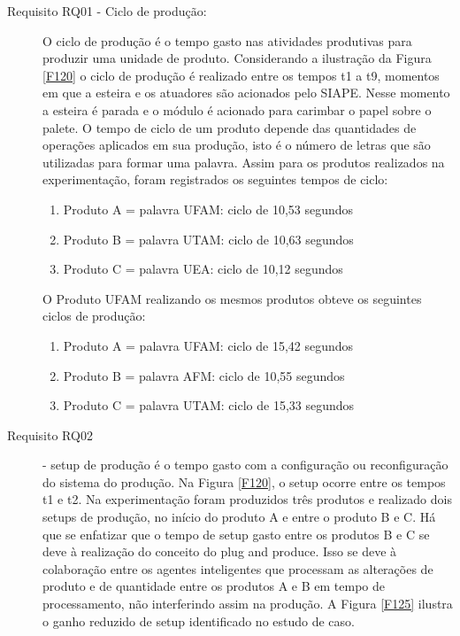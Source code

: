 \documentclass[10pt,letterpaper,twocolumn]{IEEEtran}
\begin{document}
\begin{description}
	\item[Requisito RQ01 - Ciclo de produção:] O ciclo de produção é o tempo gasto nas atividades produtivas para produzir uma unidade de produto. Considerando a ilustração da Figura \ref{F120} o ciclo de produção é realizado entre os tempos t1 a t9, momentos em que a esteira e os atuadores são acionados pelo SIAPE. Nesse momento a esteira é parada e o módulo é acionado para carimbar o papel sobre o palete. O tempo de ciclo de um produto depende das quantidades de operações aplicados em sua produção, isto é o número de letras que são utilizadas para formar uma palavra. Assim para os produtos realizados na experimentação, foram registrados os seguintes tempos de ciclo:
	\begin{enumerate}
		\item Produto A = palavra UFAM: ciclo de 10,53 segundos
		\item Produto B = palavra UTAM:  ciclo de 10,63 segundos 
		\item Produto C = palavra UEA:  ciclo de 10,12 segundos
	\end{enumerate} 
	
	O Produto UFAM realizando os mesmos produtos obteve os seguintes ciclos de produção:
	\begin{enumerate}
		\item Produto A = palavra UFAM: ciclo de 15,42 segundos
		\item Produto B = palavra AFM:  ciclo de 10,55 segundos
		\item Produto C = palavra UTAM: ciclo de 15,33 segundos
	\end{enumerate} 
	
	\item[Requisito RQ02] - setup de produção é o tempo gasto com a configuração ou reconfiguração do sistema do produção. Na Figura \ref{F120}, o setup ocorre entre os tempos t1 e t2. Na experimentação foram produzidos três produtos e realizado dois setups de produção, no início do produto A e entre o produto B e C. Há que se enfatizar que o tempo de setup gasto entre os produtos B e C se deve à realização do conceito do plug and produce. Isso se deve à colaboração entre os agentes inteligentes que processam as alterações de produto e de quantidade entre os produtos A e B em tempo de processamento, não interferindo assim na produção. A Figura \ref{F125} ilustra o ganho reduzido de setup identificado no estudo de caso.
	

\end{description}
\end{document}

